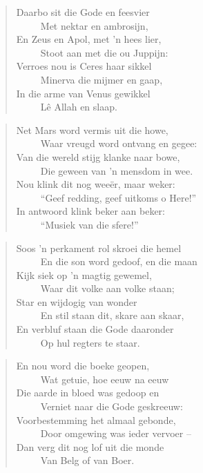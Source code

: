 \begin{verse}
Daarbo sit die Gode en feesvier \\ 
\ \ \ \ \ Met nektar en ambrosijn, \\ 
En Zeus en Apol, met ’n hees lier, \\ 
\ \ \ \ \ Stoot aan met die ou Juppijn: \\ 
Verroes nou is Ceres haar sikkel \\ 
\ \ \ \ \ Minerva die mijmer en gaap, \\ 
In die arme van Venus gewikkel \\ 
\ \ \ \ \ Lê Allah en slaap. \\ 
\end{verse}

\begin{verse}
Net Mars word vermis uit die howe, \\ 
\ \ \ \ \ Waar vreugd word ontvang en gegee: \\ 
Van die wereld stijg klanke naar bowe, \\ 
\ \ \ \ \ Die geween van ’n mensdom in wee. \\ 
Nou klink dit nog wee\"er, maar weker: \\ 
\ \ \ \ \ ``Geef redding, geef uitkoms o Here!'' \\ 
In antwoord klink beker aan beker: \\ 
\ \ \ \ \ ``Musiek van die sfere!'' \\ 
\end{verse}

\begin{verse}
Soos ’n perkament rol skroei die hemel \\ 
\ \ \ \ \ En die son word gedoof, en die maan \\ 
Kijk siek op ’n magtig gewemel, \\ 
\ \ \ \ \ Waar dit volke aan volke staan; \\ 
Star en wijdogig van wonder \\ 
\ \ \ \ \ En stil staan dit, skare aan skaar, \\ 
En verbluf staan die Gode daaronder \\ 
\ \ \ \ \ Op hul regters te staar. \\ 
\end{verse}

\begin{verse}
En nou word die boeke geopen, \\ 
\ \ \ \ \ Wat getuie, hoe eeuw na eeuw \\ 
Die aarde in bloed was gedoop en \\ 
\ \ \ \ \ Verniet naar die Gode geskreeuw: \\ 
Voorbestemming het almaal gebonde, \\ 
\ \ \ \ \ Door omgewing was ieder vervoer --  \\ 
Dan verg dit nog lof uit die monde \\ 
\ \ \ \ \ Van Belg of van Boer. \\ 
\end{verse}

